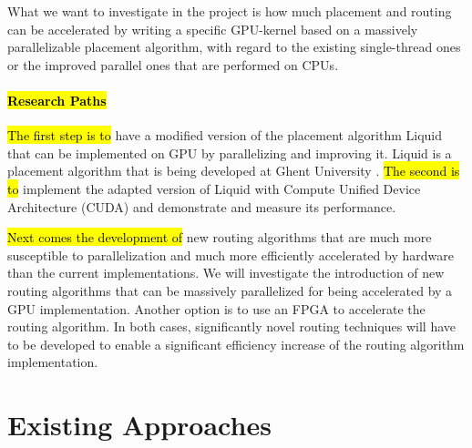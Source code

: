 \documentclass[a4paper,oneside,12pt]{article}
\begin{document}
What we want to investigate in the project is how much placement and routing can be accelerated by writing a specific GPU-kernel based on a massively parallelizable placement algorithm, with regard to the existing single-thread ones or the improved parallel ones that are performed on CPUs.
\paragraph{\hl{Research Paths}}
\hl{The first step is to} have a modified version of the placement algorithm {\sc Liquid} that can be implemented on GPU by parallelizing and improving it. {\sc Liquid} is a placement algorithm that is being developed at Ghent University \cite{liquid}.
\hl{The second is to} implement the adapted version of {\sc Liquid} with Compute Unified Device Architecture (CUDA) \cite{nickolls2008scalable} and demonstrate and measure its performance.

\hl{Next comes the development of} new routing algorithms that are much more susceptible to parallelization and much more efficiently accelerated by hardware than the current implementations. %
We will investigate the introduction of new routing algorithms that can be massively parallelized for being accelerated by a GPU implementation. Another option is to use an FPGA to accelerate the routing algorithm. In both cases, significantly novel routing techniques will have to be developed to enable a significant efficiency increase of the routing algorithm implementation.




\section{Existing Approaches}
\label{existingapproach}
\end{document}
